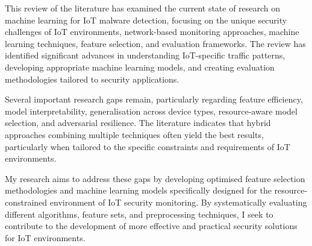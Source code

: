 This review of the literature has examined the current state of research on machine learning for IoT malware detection, focusing on the unique security challenges of IoT environments, network-based monitoring approaches, machine learning techniques, feature selection, and evaluation frameworks. The review has identified significant advances in understanding IoT-specific traffic patterns, developing appropriate machine learning models, and creating evaluation methodologies tailored to security applications.

Several important research gaps remain, particularly regarding feature efficiency, model interpretability, generalisation across device types, resource-aware model selection, and adversarial resilience. The literature indicates that hybrid approaches combining multiple techniques often yield the best results, particularly when tailored to the specific constraints and requirements of IoT environments.

My research aims to address these gaps by developing optimised feature selection methodologies and machine learning models specifically designed for the resource-constrained environment of IoT security monitoring. By systematically evaluating different algorithms, feature sets, and preprocessing techniques, I seek to contribute to the development of more effective and practical security solutions for IoT environments.